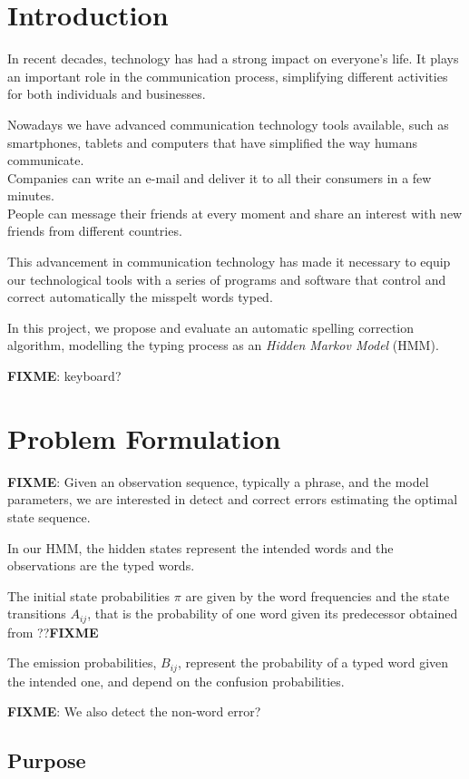 \chapter{Introduction}
\label{chap:Introduction}

In recent decades, technology has had a strong impact on everyone's life.
It plays an important role in the communication process, simplifying 
different activities for both individuals and businesses.

Nowadays we have advanced communication technology tools available, 
such as smartphones, tablets and computers that have simplified the way 
humans communicate. \\
Companies can write an e-mail and deliver it to all their consumers in a few 
minutes. \\
People can message their friends at every moment and share an interest 
with new friends from different countries.

This advancement in communication technology has made it necessary to 
equip our technological tools with a series of programs and software that 
control and correct automatically the misspelt words typed.

In this project, we propose and evaluate an automatic spelling correction 
algorithm, modelling the typing process as an \textit{Hidden Markov 
Model} (HMM). 


\textbf{FIXME}:  keyboard? 

\chapter{Problem Formulation} %
\textbf{FIXME}: Given an observation sequence, typically a phrase, and the model 
parameters, we are interested in detect and correct errors estimating the 
optimal state sequence. 

In our HMM, the hidden states represent the intended words and the 
observations are the typed words. 

The initial state probabilities $\pi$ are given by the word frequencies and 
the state transitions $A_{ij}$, that is the probability of one word given 
its predecessor obtained from ??\textbf{FIXME}

The emission probabilities, $B_{ij}$, represent the probability of a typed 
word given the intended one, and depend on the confusion probabilities.

\textbf{FIXME}: We also detect the non-word error?

\section{Purpose}

